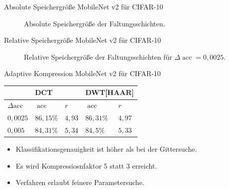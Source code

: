 \documentclass[aspectratio=169, 12pt]{beamer}
\DeclareMathOperator{\acc}{acc}
\begin{document}
\begin{frame}{Absolute Speichergröße MobileNet v2 für CIFAR-10}
  \vspace{0.2cm}
  \begin{figure}
    \caption*{Absolute Speichergröße der Faltungsschichten.}
  \end{figure}
\end{frame}

\begin{frame}{Relative Speichergröße MobileNet v2 für CIFAR-10}
  \vspace{0.2cm}
  \begin{figure}
    \caption*{Relative Speichergröße der Faltungsschichten für $\Delta \acc = 0{,}0025$.}
  \end{figure}
\end{frame}

\begin{frame}{Adaptive Kompression MobileNet v2 für CIFAR-10}
  \begin{table}[H]
    \centering
    \begin{tabular}{|l|ll|ll|}
    \hline
           & \multicolumn{2}{l|}{\textbf{DCT}}             & \multicolumn{2}{l|}{\textbf{DWT{[}HAAR{]}}}   \\ \hline
    $\Delta\text{acc}$    & \multicolumn{1}{l|}{$\acc$} & $r$  & \multicolumn{1}{l|}{$\acc$} & $r$  \\ \hline
    $0{,}0025$ & \multicolumn{1}{l|}{$86{,}15\%$}  & $4{,}93$ & \multicolumn{1}{l|}{$86{,}31\%$}  & $4{,}97$  \\ \hline
    $0{,}005$  & \multicolumn{1}{l|}{$84{,}31\%$}  & $5{,}34$ & \multicolumn{1}{l|}{$84{,}5\%$}   & $5{,}33$ \\ \hline
    \end{tabular}
\end{table}
\pause
\begin{itemize}
  \item Klassifikationsgenauigkeit ist höher als bei der Gittersuche.
  \item Es wird Kompressiosnfaktor 5 statt 3 erreicht.
  \item Verfahren erlaubt feinere Parametersuche.
\end{itemize}
\end{frame}
\end{document}
